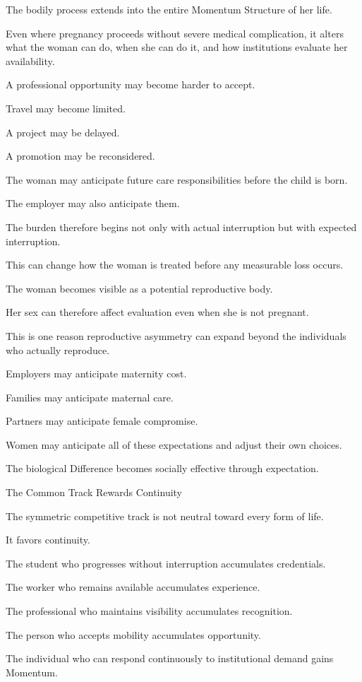 The bodily process extends into the entire Momentum Structure of her life.

Even where pregnancy proceeds without severe medical complication, it alters what the woman can do, when she can do it, and how institutions evaluate her availability.

A professional opportunity may become harder to accept.

Travel may become limited.

A project may be delayed.

A promotion may be reconsidered.

The woman may anticipate future care responsibilities before the child is born.

The employer may also anticipate them.

The burden therefore begins not only with actual interruption but with expected interruption.

This can change how the woman is treated before any measurable loss occurs.

The woman becomes visible as a potential reproductive body.

Her sex can therefore affect evaluation even when she is not pregnant.

This is one reason reproductive asymmetry can expand beyond the individuals who actually reproduce.

Employers may anticipate maternity cost.

Families may anticipate maternal care.

Partners may anticipate female compromise.

Women may anticipate all of these expectations and adjust their own choices.

The biological Difference becomes socially effective through expectation.

The Common Track Rewards Continuity

The symmetric competitive track is not neutral toward every form of life.

It favors continuity.

The student who progresses without interruption accumulates credentials.

The worker who remains available accumulates experience.

The professional who maintains visibility accumulates recognition.

The person who accepts mobility accumulates opportunity.

The individual who can respond continuously to institutional demand gains Momentum.

